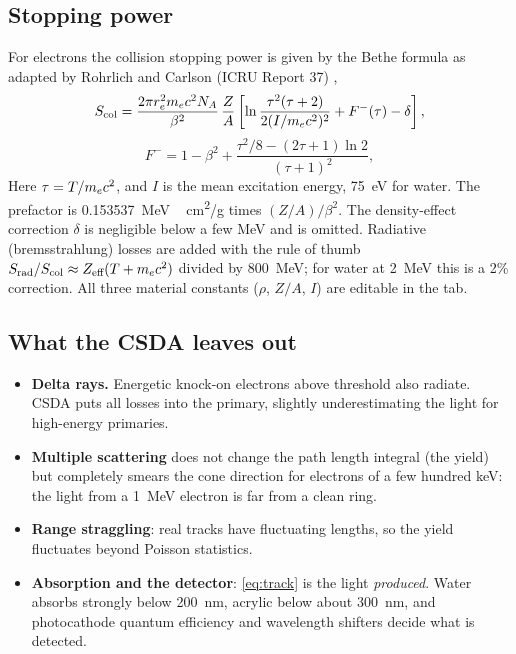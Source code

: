 \subsection{Stopping power}
For electrons the collision stopping power is given by the Bethe formula as adapted by Rohrlich and Carlson (ICRU Report 37) \cite{icru37},
\begin{equation}
S_\text{col} = \frac{2\pi r_e^2 m_e c^2 N_A}{\beta^2}\,\frac{Z}{A}\left[\ln\frac{\tau^2(\tau+2)}{2(I/m_e c^2)^2} + F^-(\tau) - \delta\right],
\end{equation}
\begin{equation}
F^- = 1 - \beta^2 + \frac{\tau^2/8 - (2\tau+1)\ln2}{(\tau+1)^2},
\end{equation}
Here $\tau = T/m_e c^2$, and $I$ is the mean excitation energy, \SI{75}{eV} for water. The prefactor is \SI{0.153537}{MeV\,cm^2/g} times $(Z/A)/\beta^2$. The density-effect correction $\delta$ is negligible below a few MeV and is omitted. Radiative (bremsstrahlung) losses are added with the rule of thumb $S_\text{rad}/S_\text{col} \approx Z_\text{eff}(T + m_e c^2)$ divided by \SI{800}{MeV}; for water at \SI{2}{MeV} this is a 2\% correction. All three material constants ($\rho$, $Z/A$, $I$) are editable in the tab.

\subsection{What the CSDA leaves out}
\begin{pitfall}
\begin{itemize}[leftmargin=1em]
\item \textbf{Delta rays.} Energetic knock-on electrons above threshold also radiate. CSDA puts all losses into the primary, slightly underestimating the light for high-energy primaries.
\item \textbf{Multiple scattering} does not change the path length integral (the yield) but completely smears the cone direction for electrons of a few hundred keV: the light from a \SI{1}{MeV} electron is far from a clean ring.
\item \textbf{Range straggling}: real tracks have fluctuating lengths, so the yield fluctuates beyond Poisson statistics.
\item \textbf{Absorption and the detector}: \cref{eq:track} is the light \emph{produced}. Water absorbs strongly below \SI{200}{nm}, acrylic below about \SI{300}{nm}, and photocathode quantum efficiency and wavelength shifters decide what is detected.
\end{itemize}
\end{pitfall}

